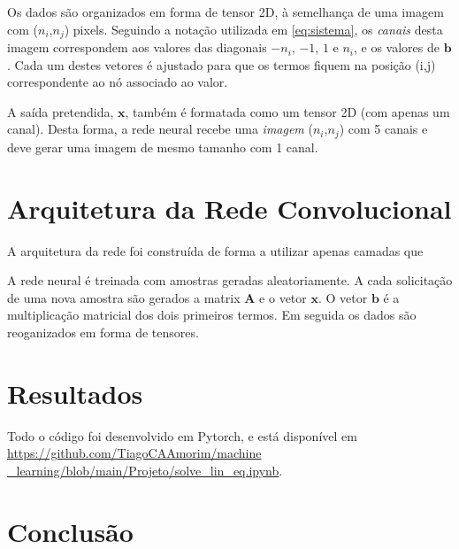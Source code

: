 \documentclass[final,5p]{elsarticle}
\numberwithin{equation}{section}
\begin{document}
    Os dados são organizados em forma de tensor 2D, à semelhança de uma imagem com ($n_i$,$n_j$) pixels. Seguindo a notação utilizada em \ref{eq:sistema}, os \emph{canais} desta imagem correspondem aos valores das diagonais $-n_i$, $-1$, $1$ e $n_i$, e os valores de $\textbf{b}$. Cada um destes vetores é ajustado para que os termos fiquem na posição (i,j) correspondente ao nó associado ao valor.

    A saída pretendida, $\textbf{x}$, também é formatada como um tensor 2D (com apenas um canal). Desta forma, a rede neural recebe uma \emph{imagem} ($n_i$,$n_j$) com 5 canais e deve gerar uma imagem de mesmo tamanho com 1 canal.

\section{Arquitetura da Rede Convolucional}

    A arquitetura da rede foi construída de forma a utilizar apenas camadas que

    A rede neural é treinada com amostras geradas aleatoriamente. A cada solicitação de uma nova amostra são gerados a matrix $\textbf{A}$ e o vetor $\textbf{x}$. O vetor $\textbf{b}$ é a multiplicação matricial dos dois primeiros termos. Em seguida os dados são reoganizados em forma de tensores.

\section{Resultados}





    Todo o código foi desenvolvido em Pytorch, e está disponível em \href{https://github.com/TiagoCAAmorim/machine\_learning/blob/main/Projeto/solve_lin_eq.ipynb}{https://github.com/TiagoCAAmorim/machine \_learning/blob/main/Projeto/solve\_lin\_eq.ipynb}.


    \section{Conclusão}
















\end{document}
